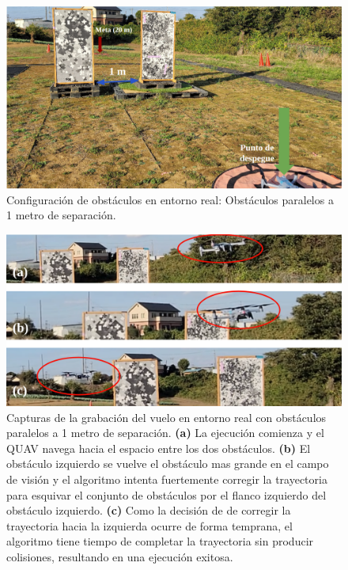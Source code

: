\begin{figure}[H]
    \centering
    \includegraphics[scale=0.27]{partes/ImgJoao/real-4-parallelC-0-config.png}
    \caption[Configuración de obstáculos en entorno real: Obstáculos paralelos a 1 metro de separación.]{Configuración de obstáculos en entorno real: Obstáculos paralelos a 1 metro de separación.}
    \label{real-4-parallelC-0-config}
\end{figure}

\begin{figure}[H]
    \centering
    \includegraphics[scale=0.25]{partes/ImgJoao/real-4-parallelC-1-frames.png}
    \caption[Capturas de la grabación del vuelo en entorno real con obstáculos paralelos a 1 metro de separación.]{Capturas de la grabación del vuelo en entorno real con obstáculos paralelos a 1 metro de separación. \textbf{(a)} La ejecución comienza y el QUAV navega hacia el espacio entre los dos obstáculos. \textbf{(b)} El obstáculo izquierdo se vuelve el obstáculo mas grande en el campo de visión y el algoritmo intenta fuertemente corregir la trayectoria para esquivar el conjunto de obstáculos por el flanco izquierdo del obstáculo izquierdo. \textbf{(c)} Como la decisión de de corregir la trayectoria hacia la izquierda ocurre de forma temprana, el algoritmo tiene tiempo de completar la trayectoria sin producir colisiones, resultando en una ejecución exitosa. }
    \label{real-4-parallelC-1-frames}
\end{figure}

